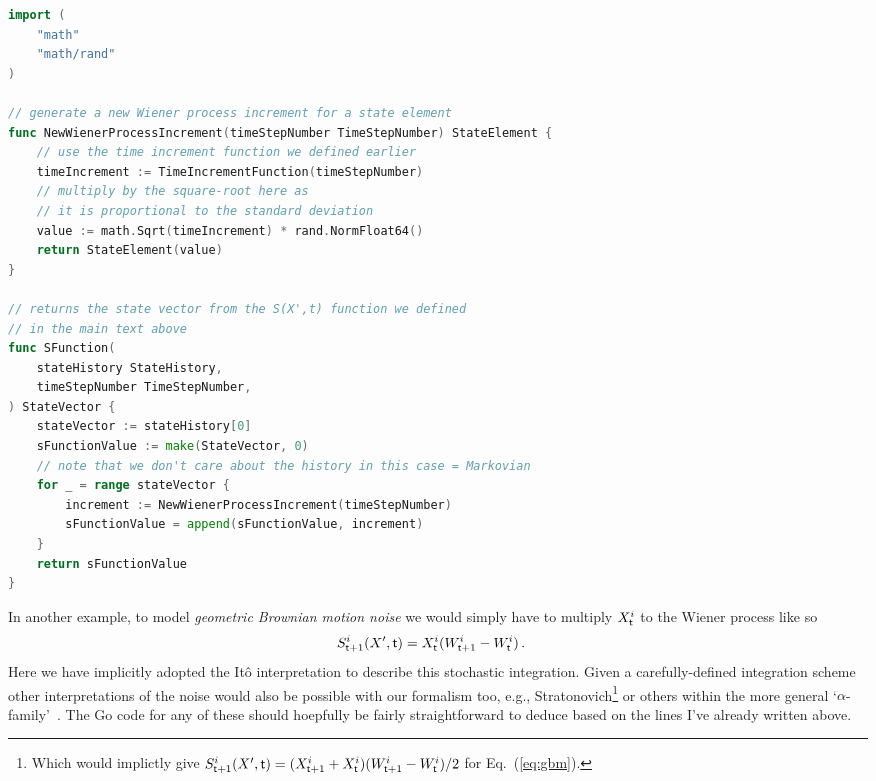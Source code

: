\documentclass{book}
\begin{document}
\begin{lstlisting}[language=Go]
import (
    "math"
    "math/rand"
)

// generate a new Wiener process increment for a state element
func NewWienerProcessIncrement(timeStepNumber TimeStepNumber) StateElement {
    // use the time increment function we defined earlier
    timeIncrement := TimeIncrementFunction(timeStepNumber)
    // multiply by the square-root here as 
    // it is proportional to the standard deviation
    value := math.Sqrt(timeIncrement) * rand.NormFloat64()
    return StateElement(value)
}

// returns the state vector from the S(X',t) function we defined 
// in the main text above
func SFunction(
    stateHistory StateHistory, 
    timeStepNumber TimeStepNumber,
) StateVector {
    stateVector := stateHistory[0]
    sFunctionValue := make(StateVector, 0)
    // note that we don't care about the history in this case = Markovian
    for _ = range stateVector {
        increment := NewWienerProcessIncrement(timeStepNumber)
        sFunctionValue = append(sFunctionValue, increment)
    }
    return sFunctionValue
}
\end{lstlisting}

In another example, to model \emph{geometric Brownian motion noise} we would simply have to multiply $X^i_{\sf t}$ to the Wiener process like so
\begin{align}
& S^{i}_{{\sf t}+1}(X',{\sf t}) = X^i_{\sf t}(W^i_{{\sf t}+1}-W^i_{\sf t})\label{eq:gbm} \,.
\end{align}
Here we have implicitly adopted the Itô interpretation to describe this stochastic integration. Given a carefully-defined integration scheme other interpretations of the noise would also be possible with our formalism too, e.g., Stratonovich\footnote{Which would implictly give $S^{i}_{{\sf t}+1}(X',{\sf t}) = (X^i_{{\sf t}+1}+X^i_{\sf t})(W^i_{{\sf t}+1}-W^i_{\sf t}) / 2$ for Eq.~(\ref{eq:gbm}).} or others within the more general `$\alpha$-family'~\cite{van1992stochastic,risken1996fokker,rog-will-2000}. The Go code for any of these should hoepfully be fairly straightforward to deduce based on the lines I've already written above.
\end{document}
